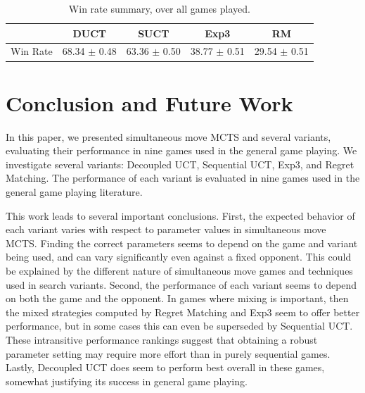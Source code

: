 \documentclass[conference]{IEEEtran}
\begin{document}
\begin{table}
\begin{center}
\begin{tabular}{|r|cccc|}
\hline
         & DUCT             & SUCT             & Exp3            & RM             \\
\hline
Win Rate & 68.34 $\pm$ 0.48   & 63.36 $\pm$ 0.50   & 38.77 $\pm$ 0.51  & 29.54 $\pm$ 0.51 \\
\hline
\end{tabular}
\end{center}
\caption{Win rate summary, over all games played. \label{tbl:summary}}
\end{table}




\section{Conclusion and Future Work}
\label{sec:conc}

In this paper, we presented simultaneous move MCTS and several variants, evaluating their performance in nine games used in the general game playing. 
We investigate several variants: Decoupled UCT, Sequential UCT, Exp3, and Regret Matching. The performance of each variant is evaluated in nine 
games used in the general game playing literature.

This work leads to several important conclusions. 
First, the expected behavior of each variant varies with respect to parameter values in simultaneous move MCTS.
Finding the correct parameters seems to depend on the game and variant being used, and can vary 
significantly even against a fixed opponent. This could be explained by the different nature of simultaneous move games and techniques used 
in search variants. Second, the performance of each variant seems to depend on both the game and the opponent. In  games where mixing is 
important, then the mixed strategies computed by Regret Matching and Exp3 seem to offer better performance, but in some cases this 
can even be superseded by Sequential UCT. These intransitive performance rankings suggest that obtaining a robust parameter setting may require more 
effort than in purely sequential games. Lastly, Decoupled UCT does seem to perform best overall in these games, somewhat 
justifying its success in general game playing. 
\end{document}
